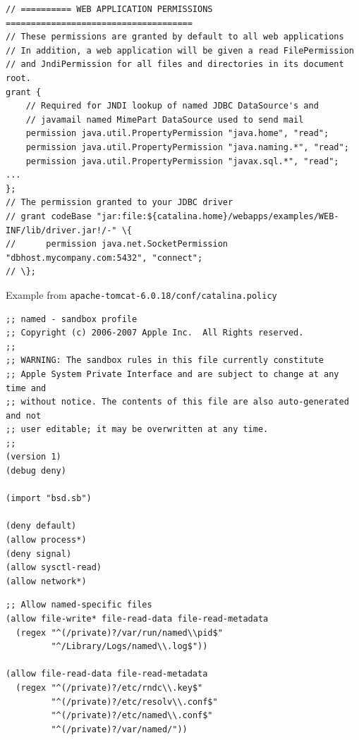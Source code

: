 \documentclass[Screen16to9,17pt]{foils}
\begin{document}

\begin{verbatim}
// ========== WEB APPLICATION PERMISSIONS =====================================
// These permissions are granted by default to all web applications
// In addition, a web application will be given a read FilePermission
// and JndiPermission for all files and directories in its document root.
grant {
    // Required for JNDI lookup of named JDBC DataSource's and
    // javamail named MimePart DataSource used to send mail
    permission java.util.PropertyPermission "java.home", "read";
    permission java.util.PropertyPermission "java.naming.*", "read";
    permission java.util.PropertyPermission "javax.sql.*", "read";
...
};
// The permission granted to your JDBC driver
// grant codeBase "jar:file:${catalina.home}/webapps/examples/WEB-INF/lib/driver.jar!/-" \{
//      permission java.net.SocketPermission "dbhost.mycompany.com:5432", "connect";
// \};
\end{verbatim}

\begin{list1}
\item Example from \verb+apache-tomcat-6.0.18/conf/catalina.policy+
\end{list1}



\begin{verbatim}
;; named - sandbox profile
;; Copyright (c) 2006-2007 Apple Inc.  All Rights reserved.
;;
;; WARNING: The sandbox rules in this file currently constitute
;; Apple System Private Interface and are subject to change at any time and
;; without notice. The contents of this file are also auto-generated and not
;; user editable; it may be overwritten at any time.
;;
(version 1)
(debug deny)

(import "bsd.sb")

(deny default)
(allow process*)
(deny signal)
(allow sysctl-read)
(allow network*)
\end{verbatim}



\begin{verbatim}
;; Allow named-specific files
(allow file-write* file-read-data file-read-metadata
  (regex "^(/private)?/var/run/named\\pid$"
         "^/Library/Logs/named\\.log$"))

(allow file-read-data file-read-metadata
  (regex "^(/private)?/etc/rndc\\.key$"
         "^(/private)?/etc/resolv\\.conf$"
         "^(/private)?/etc/named\\.conf$"
         "^(/private)?/var/named/"))
\end{verbatim}
\end{document}

